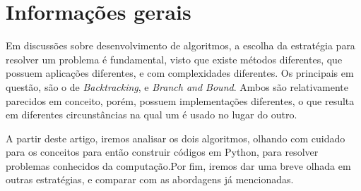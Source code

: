 \section{Informações gerais}

Em discussões sobre desenvolvimento de algoritmos, a escolha da estratégia para 
resolver um problema é fundamental, visto que existe métodos diferentes, que 
possuem aplicações diferentes, e com complexidades diferentes. Os principais
em questão, são o de \emph{Backtracking}, e \emph{Branch and Bound}. Ambos são relativamente
parecidos em conceito, porém, possuem implementações diferentes, o que resulta em diferentes
circunstâncias na qual um é usado no lugar do outro.

A partir deste artigo, iremos analisar os dois algoritmos, olhando com cuidado para os conceitos 
para então construir códigos em Python, para resolver problemas conhecidos da computação.Por fim, 
iremos dar uma breve olhada em outras estratégias, e comparar com as abordagens já mencionadas.
